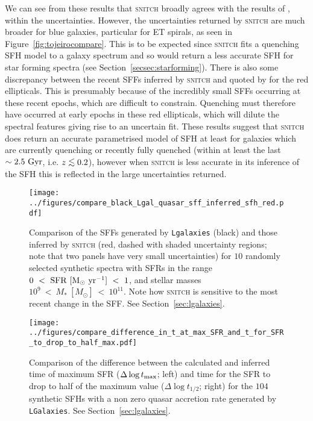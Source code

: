 \documentclass[useAMS,usenatbib]{mn2e}
\def\lesssim{\mathrel{\hbox{\rlap{\hbox{\lower3pt\hbox{$\sim$}}}\hbox{\raise2pt\hbox{$<$}}}}}
\begin{document}
We can see from these results that \textsc{snitch} broadly agrees with the results of \citeauthor{tojeiro13}, within the uncertainties. However, the uncertainties returned by \textsc{snitch} are much broader for blue galaxies, particular for ET spirals, as seen in Figure~\ref{fig:tojeirocompare}. This is to be expected since \textsc{snitch} fits a quenching SFH model to a galaxy spectrum and so would return a less accurate SFH for star forming spectra (see Section~\ref{secsec:starforming}). There is also some discrepancy between the recent SFFs inferred by \textsc{snitch} and quoted by \citeauthor{tojeiro13} for the red ellipticals. This is presumably because of the incredibly small SFFs occurring at these recent epochs, which are difficult to constrain. Quenching must therefore have occurred at early epochs in these red ellipticals, which will dilute the spectral features giving rise to an uncertain fit.  These results suggest that \textsc{snitch} does return an accurate parametrised model of SFH at least for galaxies which are currently quenching or recently fully quenched (within at least the last $\sim2.5~\rm{Gyr}$, i.e. $z \lesssim 0.2$), however when \textsc{snitch} is less accurate in its inference of the SFH this is reflected in the large uncertainties returned.   

\begin{figure}
\centering
\texttt{[image: ../figures/compare\_black\_Lgal\_quasar\_sff\_inferred\_sfh\_red.pdf]}
\caption{Comparison of the SFFs generated by \texttt{Lgalaxies} (black) and those inferred by \textsc{snitch} (red, dashed with shaded uncertainty regions; note that two panels have very small uncertainties) for $10$ randomly selected synthetic spectra with SFRs in the range $0~<~\rm{SFR}~[M_{\odot}~\rm{yr}^{-1}]~<~1$, and stellar masses $10^9~<~M_{*}~[M_{\odot}]~<~10^{11}$. Note how \textsc{snitch} is sensitive to the most recent change in the SFF. See Section~\ref{sec:lgalaxies}.}
\label{fig:lgalsfhs}
\end{figure}

\begin{figure}
\centering
\texttt{[image: ../figures/compare\_difference\_in\_t\_at\_max\_SFR\_and\_t\_for\_SFR\_to\_drop\_to\_half\_max.pdf]}
\caption{Comparison of the difference between the calculated and inferred time of maximum SFR ($\Delta \log t_{\rm{max}}$; left) and time for the SFR to drop to half of the maximum value ($\Delta \log t_{1/2}$; right) for the $104$ synthetic SFHs with a non zero quasar accretion rate generated by \texttt{LGalaxies}. See Section~\ref{sec:lgalaxies}.}
\label{fig:genlgalsfhs}
\end{figure}
\end{document}
